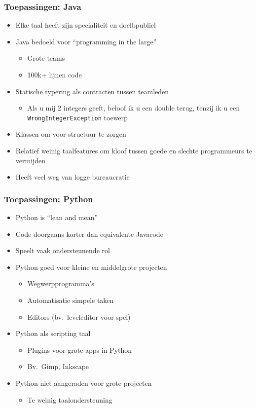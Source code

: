 \begin{frame}
  \frametitle{Toepassingen: Java}
  \begin{itemize}
    \item Elke taal heeft zijn specialiteit en doelbpubliel
    \item Java bedoeld voor ``programming in the large''
          \begin{itemize}
            \item Grote teams
            \item 100k+ lijnen code
          \end{itemize}
    \item Statische typering als contracten tussen teamleden
          \begin{itemize}
            \item Als u mij 2 integers geeft, beloof ik u een double terug, tenzij ik u een
                  \texttt{WrongIntegerException} toewerp
          \end{itemize}
    \item Klassen om voor structuur te zorgen
    \item Relatief weinig taalfeatures om kloof tussen goede en slechte programmeurs te vermijden
    \item Heeft veel weg van logge bureaucratie
  \end{itemize}
\end{frame}

\begin{frame}
  \frametitle{Toepassingen: Python}
  \begin{itemize}
    \item Python is ``lean and mean''
    \item Code doorgaans korter dan equivalente Javacode
    \item Speelt vaak ondersteunende rol
    \item Python goed voor kleine en middelgrote projecten
          \begin{itemize}
            \item Wegwerpprogramma's
            \item Automatisatie simpele taken
            \item Editors (bv.~leveleditor voor spel)
          \end{itemize}
    \item Python als scripting taal
          \begin{itemize}
            \item Plugins voor grote apps in Python
            \item Bv.~Gimp, Inkscape
          \end{itemize}
    \item Python niet aangeraden voor grote projecten
          \begin{itemize}
            \item Te weinig taalondersteuning
          \end{itemize}
  \end{itemize}
\end{frame}



